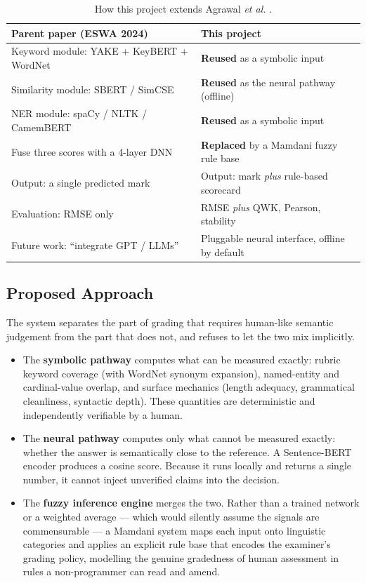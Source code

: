 \documentclass[11pt,a4paper]{article}
\begin{document}
\begin{table}[!ht]
\centering
\small
\caption{How this project extends Agrawal \emph{et al.} \cite{agrawal2024}.}
\label{tab:extension}
\begin{tabular}{@{}p{}p{}@{}}
\toprule
\textbf{Parent paper (ESWA 2024)} & \textbf{This project} \\
\midrule
Keyword module: YAKE + KeyBERT + WordNet & \textbf{Reused} as a symbolic input \\
Similarity module: SBERT / SimCSE & \textbf{Reused} as the neural pathway (offline) \\
NER module: spaCy / NLTK / CamemBERT & \textbf{Reused} as a symbolic input \\
Fuse three scores with a 4-layer DNN & \textbf{Replaced} by a Mamdani fuzzy rule base \\
Output: a single predicted mark & Output: mark \emph{plus} rule-based scorecard \\
Evaluation: RMSE only & RMSE \emph{plus} QWK, Pearson, stability \\
Future work: ``integrate GPT / LLMs'' & Pluggable neural interface, offline by default \\
\bottomrule
\end{tabular}
\end{table}

\subsection{Proposed Approach}

The system separates the part of grading that requires human-like semantic
judgement from the part that does not, and refuses to let the two mix implicitly.

\begin{itemize}[leftmargin=1.4em,itemsep=0.2em]
  \item The \textbf{symbolic pathway} computes what can be measured exactly:
  rubric keyword coverage (with WordNet synonym expansion), named-entity and
  cardinal-value overlap, and surface mechanics (length adequacy, grammatical
  cleanliness, syntactic depth). These quantities are deterministic and
  independently verifiable by a human.

  \item The \textbf{neural pathway} computes only what cannot be measured exactly:
  whether the answer is semantically close to the reference. A Sentence-BERT
  encoder produces a cosine score. Because it runs locally and returns a single
  number, it cannot inject unverified claims into the decision.

  \item The \textbf{fuzzy inference engine} merges the two. Rather than a trained
  network or a weighted average --- which would silently assume the signals are
  commensurable --- a Mamdani system \cite{mamdani1975} maps each input onto
  linguistic categories and applies an explicit rule base that encodes the
  examiner's grading policy, modelling the genuine gradedness of human assessment
  in rules a non-programmer can read and amend.
\end{itemize}
\end{document}
